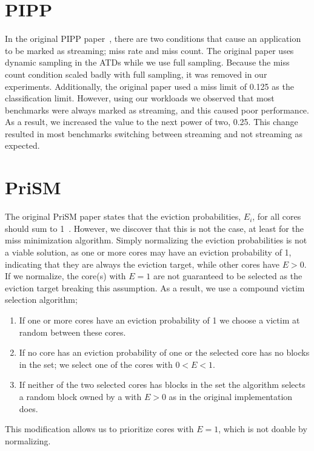 \section{PIPP}

In the original PIPP paper~\cite{Xie2009}, there are two conditions that cause an application to be marked as streaming; miss rate and miss count.
The original paper uses dynamic sampling in the ATDs while we use full sampling.
Because the miss count condition scaled badly with full sampling, it was removed in our experiments.
Additionally, the original paper used a miss limit of 0.125 as the classification limit.
However, using our workloads we observed that most benchmarks were always marked as streaming, and this caused poor performance.
As a result, we increased the value to the next power of two, 0.25.
This change resulted in most benchmarks switching between streaming and not streaming as expected.

\section{PriSM}

The original PriSM paper states that the eviction probabilities, $E_i$, for all cores should sum to 1~\cite{Manikantan2012}.
However, we discover that this is not the case, at least for the miss minimization algorithm.
Simply normalizing the eviction probabilities is not a viable solution, as one or more cores may have an eviction probability of 1, indicating that they are always the eviction target, while other cores have $E > 0$.
If we normalize, the core(s) with $E=1$ are not guaranteed to be selected as the eviction target breaking this assumption.
As a result, we use a compound victim selection algorithm;
\begin{enumerate}
\item If one or more cores have an eviction probability of 1 we choose a victim at random between these cores.
\item If no core has an eviction probability of one or the selected core has no blocks in the set; we select one of the cores with $0 < E < 1$.
\item If neither of the two selected cores has blocks in the set the algorithm selects a random block owned by a with $E > 0$ as in the original implementation does.
\end{enumerate}
This modification allows us to prioritize cores with $E = 1$, which is not doable by normalizing.